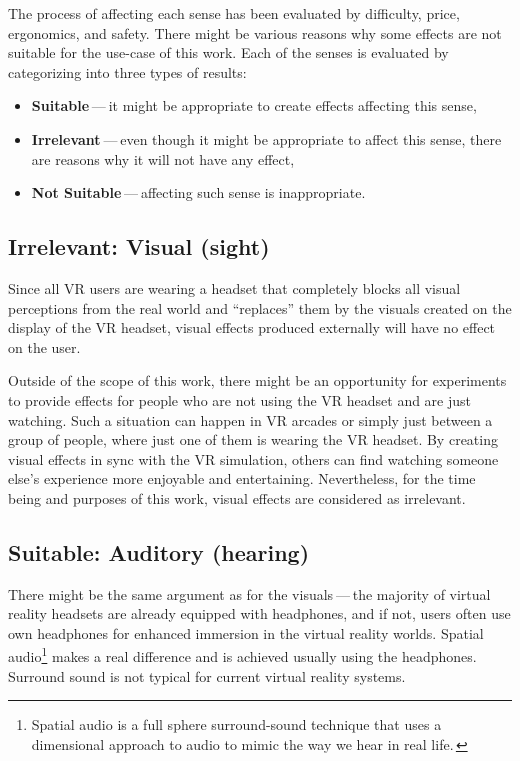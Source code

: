 The process of affecting each sense has been evaluated by difficulty,
price, ergonomics, and safety. There might be various reasons why some
effects are not suitable for the use-case of this work.
Each of the senses is evaluated by categorizing into three types of results:


\begin{itemize}
  \itemsep0em

  \item \textbf{Suitable} — it might be appropriate to create effects affecting this sense,

  \item \textbf{Irrelevant} — even though it might be appropriate to affect this sense,
  there are reasons why it will not have any effect,

  \item \textbf{Not Suitable} — affecting such sense is inappropriate.

\end{itemize}


\hypertarget{x-irrelevant:-visual-(sight)}{\subsection{Irrelevant: Visual (sight)}}
Since all VR users are wearing a headset that completely blocks
all visual perceptions from the real world and ``replaces'' them by the visuals
created on the display of the VR headset, visual effects produced externally
will have no effect on the user.


Outside of the scope of this work, there might be an opportunity for experiments
to provide effects for people who are not using the VR headset and are
just watching. Such a situation can happen in VR arcades or simply
just between a group of people, where just one of them is wearing the VR headset.
By creating visual effects in sync with the VR
simulation, others can find watching someone else's experience
more enjoyable and entertaining. Nevertheless, for the time being and purposes
of this work, visual effects are considered as irrelevant.


\hypertarget{x-suitable:-auditory-(hearing)}{\subsection{Suitable: Auditory (hearing)}}
There might be the same argument as for the visuals — the majority of virtual reality headsets are already equipped with
headphones, and if not, users often use own headphones for
enhanced immersion in the virtual reality worlds.
Spatial audio\footnote{Spatial audio is a full sphere surround-sound technique that uses a 
dimensional approach to audio to mimic the way we hear in real life.\,\cite{spaudio}}
makes a real difference and is achieved usually using the headphones.
Surround sound is not typical for current virtual reality systems.


